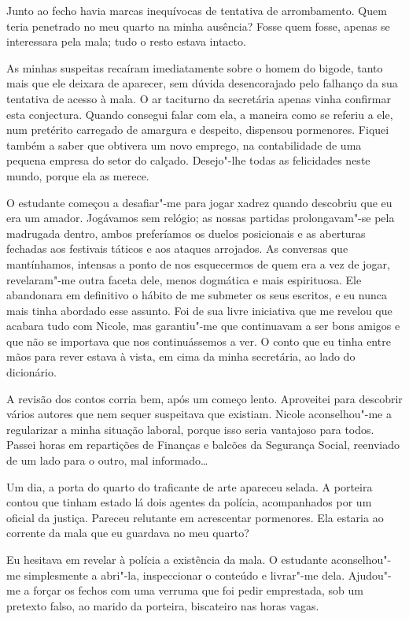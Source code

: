 Junto ao fecho havia marcas inequívocas de tentativa de arrombamento.
Quem teria penetrado no meu quarto na minha ausência? Fosse quem
fosse, apenas se interessara pela mala; tudo o resto estava intacto.

As minhas suspeitas recaíram imediatamente sobre o homem do bigode,
tanto mais que ele deixara de aparecer, sem dúvida desencorajado pelo
falhanço da sua tentativa de acesso à mala. O ar taciturno da secretária
apenas vinha confirmar esta conjectura. Quando consegui falar com ela, a
maneira como se referiu a ele, num pretérito carregado de amargura e
despeito, dispensou pormenores. Fiquei também a saber que obtivera um
novo emprego, na contabilidade de uma pequena empresa do setor do
calçado. Desejo"-lhe
todas as felicidades neste mundo, porque ela as merece.

O estudante começou a desafiar"-me para jogar xadrez quando descobriu que
eu era um amador. Jogávamos sem relógio; as nossas partidas
prolongavam"-se pela madrugada dentro, ambos preferíamos os duelos
posicionais e as aberturas fechadas aos festivais táticos e aos ataques
arrojados. As conversas que mantínhamos, intensas a ponto de nos
esquecermos de quem era a vez de jogar, revelaram"-me outra faceta dele,
menos dogmática e mais espirituosa. Ele abandonara em definitivo o
hábito de me submeter os seus escritos, e eu nunca mais tinha abordado
esse assunto. Foi de sua livre iniciativa que me revelou que acabara
tudo com Nicole, mas garantiu"-me que continuavam a ser bons amigos e que não se importava que nos
continuássemos a ver. O conto que eu tinha entre mãos para rever estava
à vista, em cima da minha secretária, ao lado do dicionário.

A revisão dos contos corria bem, após um começo lento. Aproveitei para
descobrir vários autores que nem sequer suspeitava que existiam. Nicole
aconselhou"-me a regularizar a minha situação laboral, porque isso seria
vantajoso para todos. Passei horas em repartições de Finanças e balcões
da Segurança Social, reenviado de um lado para o outro, mal
informado\ldots{}

Um dia, a porta do quarto do traficante de arte apareceu selada. A
porteira contou que tinham estado lá dois agentes da polícia,
acompanhados por um oficial da justiça. Pareceu relutante em acrescentar
pormenores. Ela estaria ao corrente da mala que eu guardava no meu
quarto?

Eu hesitava em revelar à polícia a existência da mala. O estudante
aconselhou"-me simplesmente a abri"-la, inspeccionar o conteúdo e
livrar"-me dela. Ajudou"-me a forçar os fechos com
uma verruma que foi pedir emprestada, sob um pretexto falso, ao marido
da porteira, biscateiro nas horas vagas.

